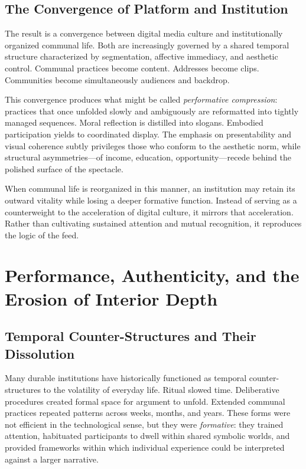\documentclass[12pt]{article}
\begin{document}
\subsection{The Convergence of Platform and Institution}

The result is a convergence between digital media culture and institutionally organized communal life. Both are increasingly governed by a shared temporal structure characterized by segmentation, affective immediacy, and aesthetic control. Communal practices become content. Addresses become clips. Communities become simultaneously audiences and backdrop.

This convergence produces what might be called \emph{performative compression}: practices that once unfolded slowly and ambiguously are reformatted into tightly managed sequences. Moral reflection is distilled into slogans. Embodied participation yields to coordinated display. The emphasis on presentability and visual coherence subtly privileges those who conform to the aesthetic norm, while structural asymmetries---of income, education, opportunity---recede behind the polished surface of the spectacle.

When communal life is reorganized in this manner, an institution may retain its outward vitality while losing a deeper formative function. Instead of serving as a counterweight to the acceleration of digital culture, it mirrors that acceleration. Rather than cultivating sustained attention and mutual recognition, it reproduces the logic of the feed.

\section{Performance, Authenticity, and the Erosion of Interior Depth}
\label{sec:belief}

\subsection{Temporal Counter-Structures and Their Dissolution}

Many durable institutions have historically functioned as temporal counter-structures to the volatility of everyday life. Ritual slowed time. Deliberative procedures created formal space for argument to unfold. Extended communal practices repeated patterns across weeks, months, and years. These forms were not efficient in the technological sense, but they were \emph{formative}: they trained attention, habituated participants to dwell within shared symbolic worlds, and provided frameworks within which individual experience could be interpreted against a larger narrative.
\end{document}
